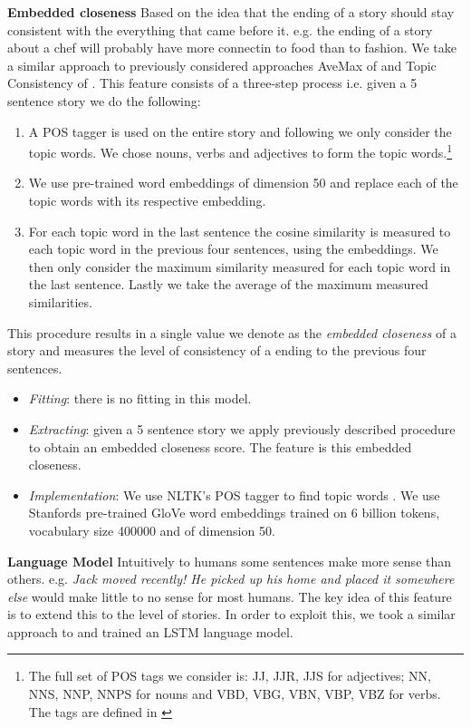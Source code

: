 \documentclass{article}
\begin{document}
\textbf{Embedded closeness} Based on the idea that the ending of a story should stay consistent with the everything that came before it. e.g. the ending of a story about a chef will probably have more connectin to food than to fashion. We take a similar approach to previously considered approaches AveMax of \cite{LSTMClassifier} and Topic Consistency of \cite{COGCOMP}.
This feature consists of a three-step process i.e. given a 5 sentence story we do the following:
\begin{enumerate}
	\item A POS tagger is used on the entire story and following \cite{COGCOMP} we only consider the topic words. We chose nouns, verbs and adjectives to form the topic words.\footnote{The full set of POS tags we consider is: JJ, JJR, JJS for adjectives; NN, NNS, NNP, NNPS for  nouns and VBD, VBG, VBN, VBP, VBZ for verbs. The tags are defined in \cite{TREEBANK}}
	\item We use pre-trained word embeddings of dimension 50 and replace each of the topic words with its respective embedding.
	\item For each topic word in the last sentence the cosine similarity is measured to each topic word in the previous four sentences, using the embeddings. We then only consider the maximum similarity measured for each topic word in the last sentence. Lastly we take the average of the maximum measured similarities. 
\end{enumerate}
This procedure results in a single value we denote as the \textit{embedded closeness} of a story and measures the level of consistency of a ending to the previous four sentences.
\begin{itemize}
	\item \textit{Fitting}: there is no fitting in this model.
	\item \textit{Extracting}: given a 5 sentence story we apply previously described procedure to obtain an embedded closeness score. The feature is this embedded closeness.
	\item \textit{Implementation}: We use NLTK's POS tagger to find topic words \cite{NLTK_VADER}. We use Stanfords pre-trained GloVe word embeddings \cite{GLOVE} trained on 6 billion tokens, vocabulary size 400000  and of dimension 50.
\end{itemize}

\textbf{Language Model} Intuitively to humans some sentences make more sense than others. e.g. \textit{Jack moved recently! He picked up his home and placed it somewhere else} would make little to no sense for most humans. The key idea of this feature is to extend this to the level of stories. In order to exploit this, we took a similar approach to \cite{UWNLP} and trained an LSTM language model. 
\end{document}
